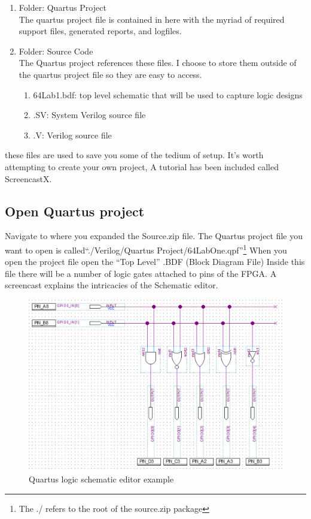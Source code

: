     \begin{enumerate}
    \item Folder: Quartus Project \\
      The quartus project file is contained in here with the myriad of required support files, generated reports, and logfiles.
    \item Folder: Source Code \\
      The Quartus project references these files. I choose to store them outside of the quartus project file so they are easy to access.
      \begin{enumerate}
        \item 64Lab1.bdf: top level schematic that will be used to capture logic designs
        \item .SV: System Verilog source file
        \item .V: Verilog source file
      \end{enumerate}
    \end{enumerate}
    these files are used to save you some of the tedium of setup. It's worth attempting to create your own project, A tutorial has been included called ScreencastX.
    
    \subsection{Open Quartus project}
    Navigate to where you expanded the Source.zip file. The Quartus project file you want to open is called``./Verilog/Quartus Project/64LabOne.qpf''\footnote{The ./ refers to the root of the source.zip package} When you open the project file open the ``Top Level'' .BDF (Block Diagram File) Inside this file there will be a number of logic gates attached to pins of the FPGA. A screencast explains the intricacies of the Schematic editor.
    \begin{figure}[htpb]
      \includegraphics[width=.48\textwidth]{Images/LogicPreview.png}
      \caption{Quartus logic schematic editor example}
      \label{nanoBlock}
    \end{figure}


